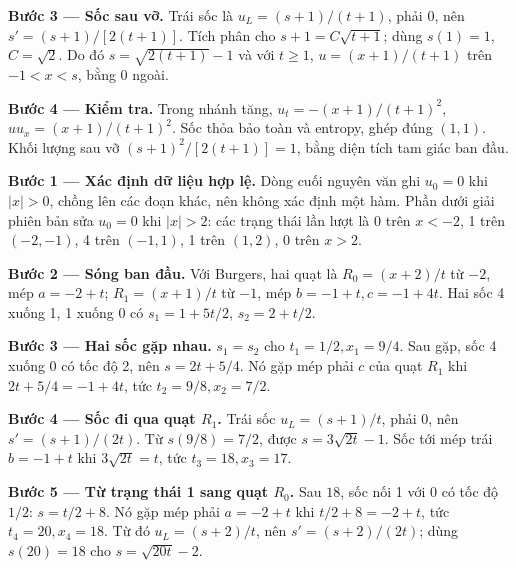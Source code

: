 \textbf{Bước 3 — Sốc sau vỡ.} Trái sốc là $u_L=(s+1)/(t+1)$, phải 0, nên $s'=(s+1)/[2(t+1)]$. Tích phân cho $s+1=C\sqrt{t+1}$; dùng $s(1)=1$, $C=\sqrt2$. Do đó $s=\sqrt{2(t+1)}-1$ và với $t\ge1$, $u=(x+1)/(t+1)$ trên $-1<x<s$, bằng 0 ngoài.

\textbf{Bước 4 — Kiểm tra.} Trong nhánh tăng, $u_t=-(x+1)/(t+1)^2$, $uu_x=(x+1)/(t+1)^2$. Sốc thỏa bảo toàn và entropy, ghép đúng $(1,1)$. Khối lượng sau vỡ $(s+1)^2/[2(t+1)]=1$, bằng diện tích tam giác ban đầu.

\textbf{Bước 1 — Xác định dữ liệu hợp lệ.} Dòng cuối nguyên văn ghi $u_0=0$ khi $|x|>0$, chồng lên các đoạn khác, nên không xác định một hàm. Phần dưới giải phiên bản sửa $u_0=0$ khi $|x|>2$: các trạng thái lần lượt là 0 trên $x<-2$, 1 trên $(-2,-1)$, 4 trên $(-1,1)$, 1 trên $(1,2)$, 0 trên $x>2$.

\textbf{Bước 2 — Sóng ban đầu.} Với Burgers, hai quạt là $R_0=(x+2)/t$ từ $-2$, mép $a=-2+t$; $R_1=(x+1)/t$ từ $-1$, mép $b=-1+t,c=-1+4t$. Hai sốc 4 xuống 1, 1 xuống 0 có $s_1=1+5t/2$, $s_2=2+t/2$.

\textbf{Bước 3 — Hai sốc gặp nhau.} $s_1=s_2$ cho $t_1=1/2,x_1=9/4$. Sau gặp, sốc 4 xuống 0 có tốc độ 2, nên $s=2t+5/4$. Nó gặp mép phải $c$ của quạt $R_1$ khi $2t+5/4=-1+4t$, tức $t_2=9/8,x_2=7/2$.

\textbf{Bước 4 — Sốc đi qua quạt $R_1$.} Trái sốc $u_L=(s+1)/t$, phải 0, nên $s'=(s+1)/(2t)$. Từ $s(9/8)=7/2$, được $s=3\sqrt{2t}-1$. Sốc tới mép trái $b=-1+t$ khi $3\sqrt{2t}=t$, tức $t_3=18,x_3=17$.

\textbf{Bước 5 — Từ trạng thái 1 sang quạt $R_0$.} Sau $18$, sốc nối 1 với 0 có tốc độ $1/2$: $s=t/2+8$. Nó gặp mép phải $a=-2+t$ khi $t/2+8=-2+t$, tức $t_4=20,x_4=18$. Từ đó $u_L=(s+2)/t$, nên $s'=(s+2)/(2t)$; dùng $s(20)=18$ cho $s=\sqrt{20t}-2$.

